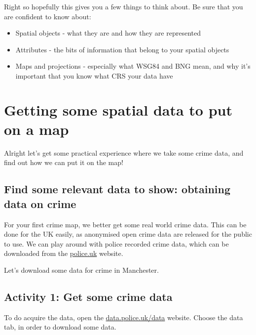 \documentclass[
]{book}
\providecommand{\tightlist}{%
  \setlength{\itemsep}{0pt}\setlength{\parskip}{0pt}}
\begin{document}
Right so hopefully this gives you a few things to think about. Be sure that you are confident to know about:

\begin{itemize}
\tightlist
\item
  Spatial objects - what they are and how they are represented
\item
  Attributes - the bits of information that belong to your spatial objects
\item
  Maps and projections - especially what WSG84 and BNG mean, and why it's important that you know what CRS your data have
\end{itemize}

\hypertarget{getting-some-spatial-data-to-put-on-a-map}{%
\section{Getting some spatial data to put on a map}\label{getting-some-spatial-data-to-put-on-a-map}}

Alright let's get some practical experience where we take some crime data, and find out how we can put it on the map!

\hypertarget{find-some-relevant-data-to-show-obtaining-data-on-crime}{%
\subsection{Find some relevant data to show: obtaining data on crime}\label{find-some-relevant-data-to-show-obtaining-data-on-crime}}

For your first crime map, we better get some real world crime data. This can be done for the UK easily, as anonymised open crime data are released for the public to use. We can play around with police recorded crime data, which can be downloaded from the \href{https://data.police.uk/data/}{police.uk} website.

Let's download some data for crime in Manchester.

\hypertarget{activity-1-get-some-crime-data}{%
\subsection{Activity 1: Get some crime data}\label{activity-1-get-some-crime-data}}

To do acquire the data, open the \href{https://data.police.uk/data/}{data.police.uk/data} website. Choose the data tab, in order to download some data.
\end{document}
